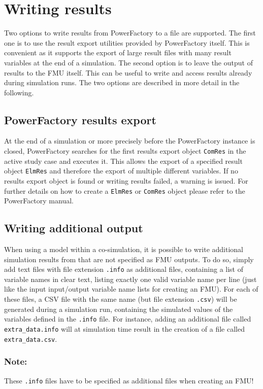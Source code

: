 \chapter{Writing results}
\label{sec:additional_output}

Two options to write results from PowerFactory to a file are supported.
The first one is to use the result export utilities provided by PowerFactory itself.
This is convenient as it supports the export of large result files with many result variables at the end of a simulation.
The second option is to leave the output of results to the FMU itself.
This can be useful to write and access results already during simulation runs.
The two options are described in more detail in the following.

\section{PowerFactory results export}
At the end of a simulation or more precisely before the PowerFactory instance is closed, PowerFactory searches for the first results export object \texttt{ComRes} in the active study case and executes it.
This allows the export of a specified result object \texttt{ElmRes} and therefore the export of multiple different variables.
If no results export object is found or writing results failed, a warning is issued.
For further details on how to create a \texttt{ElmRes} or \texttt{ComRes} object please refer to the PowerFactory manual.

\section{Writing additional output}
When using a \pf model within a co-simulation, it is possible to write additional simulation results from \pf that are not specified as FMU outputs.
To do so, simply add text files with file extension \texttt{.info} as additional files, containing a list of variable names in clear text, listing exactly one valid variable name per line (just like the input input/output variable name lists for creating an FMU).
For each of these files, a CSV file with the same name (but file extension \texttt{.csv}) will be generated during a simulation run, containing the simulated values of the variables defined in the \texttt{.info} file.
For instance, adding an additional file called \texttt{extra\_data.info} will at simulation time result in the creation of a file called \texttt{extra\_data.csv}.

\subsection*{Note:}
These \texttt{.info} files have to be specified as additional files when creating an FMU!